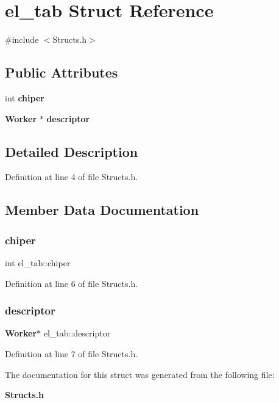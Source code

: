 \section{el\+\_\+tab Struct Reference}
\label{structel__tab}


{\ttfamily \#include $<$Structs.\+h$>$}

\subsection*{Public Attributes}
\begin{DoxyCompactItemize}
\item 
int \textbf{ chiper}
\item 
\textbf{ Worker} $\ast$ \textbf{ descriptor}
\end{DoxyCompactItemize}


\subsection{Detailed Description}


Definition at line 4 of file Structs.\+h.



\subsection{Member Data Documentation}
\mbox{\label{structel__tab_ad4b1e3306733818e62746b2d7cc81a28}} 
\subsubsection{chiper}
{\footnotesize\ttfamily int el\+\_\+tab\+::chiper}



Definition at line 6 of file Structs.\+h.

\mbox{\label{structel__tab_aa17cfde2ea3356e0210c34f67a3a18d5}} 
\subsubsection{descriptor}
{\footnotesize\ttfamily \textbf{ Worker}$\ast$ el\+\_\+tab\+::descriptor}



Definition at line 7 of file Structs.\+h.



The documentation for this struct was generated from the following file\+:\begin{DoxyCompactItemize}
\item 
\textbf{ Structs.\+h}\end{DoxyCompactItemize}
